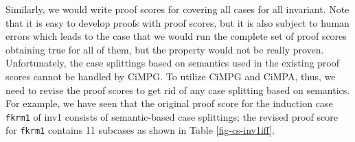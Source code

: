 \documentclass[a4paper,fleqn]{cas-dc}
\begin{document}
Similarly, we would write proof scores for covering all cases for all invariant. Note that it is easy to develop proofs with proof scores, but it is also subject to human errors which leads to the case that we would run the complete set of proof scores obtaining true for all of them, but the property would not be really proven.  Unfortunately, the case splittings based on semantics used in the existing proof scores cannot be handled by CiMPG. To utilize CiMPG and CiMPA, 
thus, we need to revise the proof scores to get rid of any case splitting based on semantics. For example, we have seen that the original proof score for the induction case  \verb!fkrm1! of inv1 consists of semantic-based case splittings; the revised proof score for \verb!fkrm1! contains 11 subcases as shown in Table \ref{fig-cs-inv1iff}.
\noindent
\end{document}
